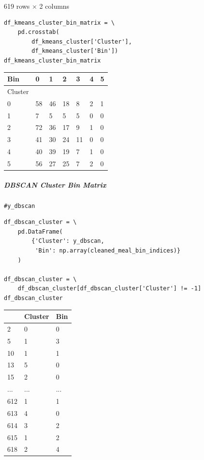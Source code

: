 \bigskip

619 rows $\times$ 2 columns

\begin{verbatim}
df_kmeans_cluster_bin_matrix = \
    pd.crosstab(
        df_kmeans_cluster['Cluster'], 
        df_kmeans_cluster['Bin'])
df_kmeans_cluster_bin_matrix
\end{verbatim}

\bigskip\noindent
\begin{tabular}{p{}p{}p{}p{}p{}p{}p{}}
\toprule
Bin & 0 & 1 & 2 & 3 & 4 & 5 \\
\hline
Cluster &  &  &  &  &  &  \\
\hline
0 & 58 & 46 & 18 & 8 & 2 & 1 \\
\hline
1 & 7 & 5 & 5 & 5 & 0 & 0 \\
\hline
2 & 72 & 36 & 17 & 9 & 1 & 0 \\
\hline
3 & 41 & 30 & 24 & 11 & 0 & 0 \\
\hline
4 & 40 & 39 & 19 & 7 & 1 & 0 \\
\hline
5 & 56 & 27 & 25 & 7 & 2 & 0 \\
\hline
\bottomrule
\end{tabular}

\bigskip

\subparagraph{DBSCAN Cluster Bin Matrix}

\begin{verbatim}
#y_dbscan
\end{verbatim}

\begin{verbatim}
df_dbscan_cluster = \
    pd.DataFrame(
        {'Cluster': y_dbscan,
         'Bin': np.array(cleaned_meal_bin_indices)}
    )

df_dbscan_cluster = \
    df_dbscan_cluster[df_dbscan_cluster['Cluster'] != -1]
df_dbscan_cluster
\end{verbatim}

\bigskip\noindent
\begin{tabular}{p{}p{}p{}}
\toprule
 & Cluster & Bin \\
\hline
2 & 0 & 0 \\
\hline
5 & 1 & 3 \\
\hline
10 & 1 & 1 \\
\hline
13 & 5 & 0 \\
\hline
15 & 2 & 0 \\
\hline
... & ... & ... \\
\hline
612 & 1 & 1 \\
\hline
613 & 4 & 0 \\
\hline
614 & 3 & 2 \\
\hline
615 & 1 & 2 \\
\hline
618 & 2 & 4 \\
\hline
\bottomrule
\end{tabular}

